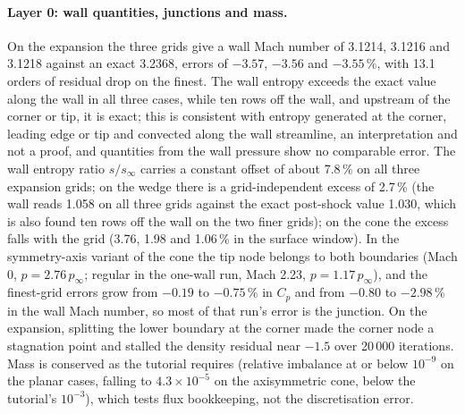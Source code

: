 \documentclass[twocolumn]{labreport}
\newcommand{\Cp}{C_p}
\newcommand{\pinf}{p_\infty}
\begin{document}
\paragraph{Layer 0: wall quantities, junctions and mass.}
On the expansion the three grids give a wall Mach number of 3.1214, 3.1216 and 3.1218 against an exact 3.2368, errors of $-3.57$, $-3.56$ and $-3.55\,\%$, with 13.1 orders of residual drop on the finest.
The wall entropy exceeds the exact value along the wall in all three cases, while ten rows off the wall, and upstream of the corner or tip, it is exact; this is consistent with entropy generated at the corner, leading edge or tip and convected along the wall streamline, an interpretation and not a proof, and quantities from the wall pressure show no comparable error.
The wall entropy ratio $s/s_\infty$ carries a constant offset of about 7.8\,\% on all three expansion grids; on the wedge there is a grid-independent excess of 2.7\,\% (the wall reads 1.058 on all three grids against the exact post-shock value 1.030, which is also found ten rows off the wall on the two finer grids); on the cone the excess falls with the grid (3.76, 1.98 and 1.06\,\% in the surface window).
In the symmetry-axis variant of the cone the tip node belongs to both boundaries (Mach 0, $p=2.76\,\pinf$; regular in the one-wall run, Mach 2.23, $p=1.17\,\pinf$), and the finest-grid errors grow from $-0.19$ to $-0.75\,\%$ in $\Cp$ and from $-0.80$ to $-2.98\,\%$ in the wall Mach number, so most of that run's error is the junction.
On the expansion, splitting the lower boundary at the corner made the corner node a stagnation point and stalled the density residual near $-1.5$ over 20\,000 iterations.
Mass is conserved as the tutorial requires (relative imbalance at or below $10^{-9}$ on the planar cases, falling to $4.3\times10^{-5}$ on the axisymmetric cone, below the tutorial's $10^{-3}$), which tests flux bookkeeping, not the discretisation error.
\end{document}
